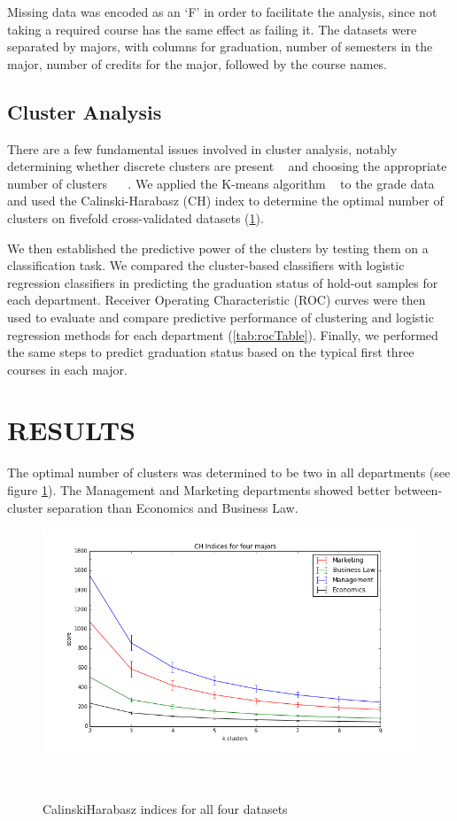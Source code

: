 \documentclass{sigchi}
\begin{document}
Missing data was encoded as an ‘F’ in order to facilitate the analysis, since not taking a required course has the same effect as failing it. The datasets were separated by majors, with columns for graduation, number of semesters in the major, number of credits for the major, followed by the course names. 


\subsection{Cluster Analysis}

There are a few fundamental issues involved in cluster analysis, notably determining whether discrete clusters are present ~\cite{knights2014rethinking} and choosing the appropriate number of clusters ~\cite{gordon1999classification} ~\cite{duda2012pattern}. We applied the K-means algorithm ~\cite{macqueen1967some} to the grade data and used the Calinski-Harabasz (CH) index \cite{calinski1974dendrite} to determine the optimal number of clusters on fivefold cross-validated datasets (\ref{fig:CHindex}).

We then established the predictive power of the clusters by testing them on a classification task. We compared the cluster-based classifiers with logistic regression classifiers in predicting the graduation status of hold-out samples for each department. Receiver Operating Characteristic (ROC) curves were then used to evaluate and compare predictive performance of clustering and logistic regression methods for each department (\ref{tab:rocTable}). Finally, we performed the same steps to predict graduation status based on the typical first three courses in each major.


\section{RESULTS}

The optimal number of clusters was determined to be two in all departments (see figure \ref{fig:CHindex}). The Management and Marketing departments showed better between-cluster separation than Economics and Business Law. 

\begin{figure}
\centering
  \includegraphics[width=1.1\columnwidth]{figures/ch-4-majors.png}
  \caption{Calinski\-Harabasz indices for all four datasets}~\label{fig:CHindex}
\end{figure}
\end{document}
